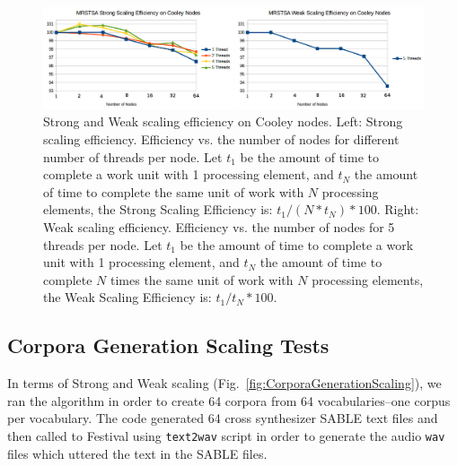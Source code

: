 \documentclass[11pt,a4paper]{article}
\begin{document}
\begin{figure}[h!]
    \centering
    \includegraphics[width=1.0\textwidth]{MRSTSA_Scaling_Efficiency.png}
    \caption{Strong and Weak scaling efficiency on Cooley nodes. Left: Strong scaling efficiency. Efficiency vs. the number of nodes for different number of threads per node. Let $t_1$ be the amount of time to complete a work unit with 1 processing element, and $t_N$ the amount of time to complete the same unit of work with $N$ processing elements, the Strong Scaling Efficiency is: $t_1 / (N * t_N) * 100$. Right: Weak scaling efficiency. Efficiency vs. the number of nodes for 5 threads per node. Let $t_1$ be the amount of time to complete a work unit with 1 processing element, and $t_N$ the amount of time to complete $N$ times the same unit of work with $N$ processing elements, the Weak Scaling Efficiency is: $t_1 / t_N * 100$.}
    \label{fig:MRSTSA_Scaling_Efficiency}
\end{figure}




























\subsection{Corpora Generation Scaling Tests}

In terms of Strong and Weak scaling (Fig.~\ref{fig:CorporaGenerationScaling}), we ran the algorithm in order to create 64 corpora from 64 vocabularies--one corpus per vocabulary. The code generated 64 cross synthesizer SABLE text files and then called to Festival using \texttt{text2wav} script in order to generate the audio \texttt{wav} files which uttered the text in the SABLE files.
\end{document}
